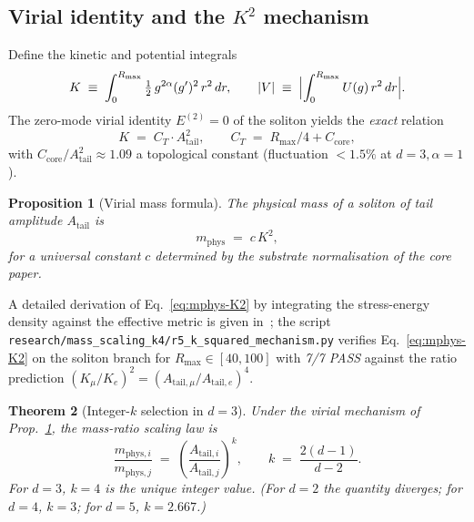 \documentclass[11pt,a4paper]{article}
\newcommand{\Atail}{A_{\mathrm{tail}}}
\newcommand{\mphys}{m_{\mathrm{phys}}}
\newtheorem{theorem}{Theorem}
\newtheorem{proposition}[theorem]{Proposition}
\begin{document}
\subsection{Virial identity and the \texorpdfstring{$K^{2}$}{K-squared} mechanism}

Define the kinetic and potential integrals
\begin{equation}\label{eq:K-V}
  K \;\equiv\;
  \int_{0}^{R_{\max}} \tfrac{1}{2}\,g^{2\alpha}(g')^{2}\,r^{2}\,dr,
  \qquad
  |V| \;\equiv\;
  \Bigl|\int_{0}^{R_{\max}} U(g)\,r^{2}\,dr\Bigr|.
\end{equation}
The zero-mode virial identity $E^{(2)}\!=\!0$ of the soliton yields the
\emph{exact} relation~\cite{TGP-repo}
\begin{equation}\label{eq:K-A2}
  K \;=\; C_{T}\cdot \Atail^{2},
  \qquad
  C_{T} \;=\; R_{\max}/4 + C_{\mathrm{core}},
\end{equation}
with $C_{\mathrm{core}}/\Atail^{2}\!\approx\!1.09$ a topological
constant (fluctuation $<\!1.5\%$ at $d=3,\alpha=1$).

\begin{proposition}[Virial mass formula]\label{prop:virial}
The physical mass of a soliton of tail amplitude $\Atail$ is
\begin{equation}\label{eq:mphys-K2}
  \mphys \;=\; c\,K^{2},
\end{equation}
for a universal constant $c$ determined by the substrate normalisation
of the core paper.
\end{proposition}

\noindent
A detailed derivation of Eq.~\eqref{eq:mphys-K2} by integrating the
stress-energy density against the effective metric is given
in~\cite{TGP-core}; the script
\verb|research/mass_scaling_k4/r5_k_squared_mechanism.py| verifies
Eq.~\eqref{eq:mphys-K2} on the soliton branch for $R_{\max}\!\in\![40,100]$
with \emph{7/7 PASS} against the ratio prediction
$(K_{\mu}/K_{e})^{2}=(A_{\mathrm{tail},\mu}/A_{\mathrm{tail},e})^{4}$.

\begin{theorem}[Integer-$k$ selection in $d=3$]\label{thm:k4}
Under the virial mechanism of Prop.~\ref{prop:virial}, the mass-ratio
scaling law is
\begin{equation}\label{eq:k4-scaling}
  \frac{m_{\mathrm{phys},i}}{m_{\mathrm{phys},j}} \;=\; \left(\frac{A_{\mathrm{tail},i}}{A_{\mathrm{tail},j}}\right)^{k},
  \qquad
  k \;=\; \frac{2(d-1)}{d-2}.
\end{equation}
For $d=3$, $k=4$ is the unique integer value. (For $d=2$ the quantity
diverges; for $d=4$, $k=3$; for $d=5$, $k=2.667$.)
\end{theorem}
\end{document}
